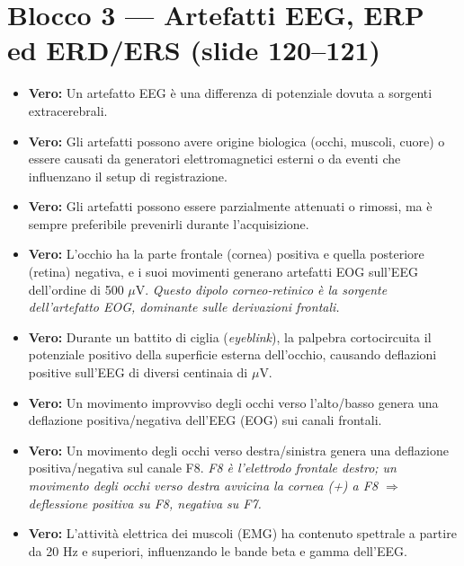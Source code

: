 \section{Blocco 3 — Artefatti EEG, ERP ed ERD/ERS (slide 120--121)}

\begin{itemize}
    \item \textbf{Vero:} Un artefatto EEG è una differenza di potenziale dovuta a sorgenti extracerebrali.
    
    \item \textbf{Vero:} Gli artefatti possono avere origine biologica (occhi, muscoli, cuore) o essere causati da generatori elettromagnetici esterni o da eventi che influenzano il setup di registrazione.
    
    \item \textbf{Vero:} Gli artefatti possono essere parzialmente attenuati o rimossi, ma è sempre preferibile prevenirli durante l'acquisizione.
    
    \item \textbf{Vero:} L'occhio ha la parte frontale (cornea) positiva e quella posteriore (retina) negativa, e i suoi movimenti generano artefatti EOG sull'EEG dell'ordine di 500 $\mu$V.
    \textit{Questo dipolo corneo-retinico è la sorgente dell'artefatto EOG, dominante sulle derivazioni frontali.}
    
    \item \textbf{Vero:} Durante un battito di ciglia (\textit{eyeblink}), la palpebra cortocircuita il potenziale positivo della superficie esterna dell'occhio, causando deflazioni positive sull'EEG di diversi centinaia di $\mu$V.
    
    \item \textbf{Vero:} Un movimento improvviso degli occhi verso l'alto/basso genera una deflazione positiva/negativa dell'EEG (EOG) sui canali frontali.
    
    \item \textbf{Vero:} Un movimento degli occhi verso destra/sinistra genera una deflazione positiva/negativa sul canale F8.
    \textit{F8 è l'elettrodo frontale destro; un movimento degli occhi verso destra avvicina la cornea (+) a F8 $\Rightarrow$ deflessione positiva su F8, negativa su F7.}
    
    \item \textbf{Vero:} L'attività elettrica dei muscoli (EMG) ha contenuto spettrale a partire da 20 Hz e superiori, influenzando le bande beta e gamma dell'EEG.
    

\end{itemize}
